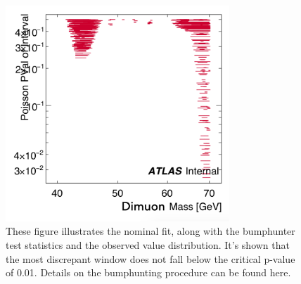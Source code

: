 \begin{figure}[!htb]
\begin{center}
        \includegraphics[width=0.75\textwidth]{figures/chapter_dimuon/NominalFit}        
        \caption{
        These figure illustrates the nominal fit, along with the bumphunter test statistics and the observed value distribution. It's shown that the most discrepant window does not fall below the critical p-value of 0.01. Details on the bumphunting procedure can be found here. }
            \label{fig:dimuonstudies}
    \end{center}
\end{figure}


